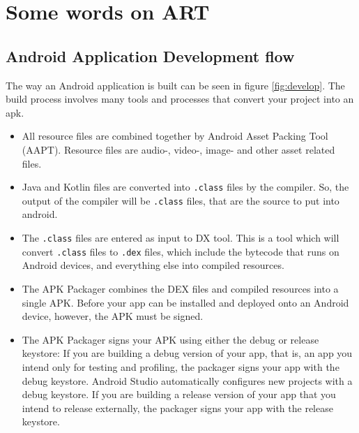 \section{Some words on ART}
\subsection{Android Application Development flow}
The way an Android application is built can be seen in figure \ref{fig:develop}.
The build process involves many tools and processes that convert your project into an \gls{apk}.

\begin{itemize}
	\item All resource files are combined together by Android Asset Packing Tool (AAPT).
		Resource files are audio-, video-, image-  and other asset related files.
	\item Java and Kotlin files are converted into \texttt{.class} files by the compiler.
		So, the output of the compiler will be \texttt{.class} files, that are the source to put into android.
	\item The \texttt{.class}  files are entered as input to DX tool.
		This is a tool which will convert \texttt{.class} files to \texttt{.dex} files, which include the bytecode that runs on Android devices, and everything else into compiled resources.
	\item The APK Packager combines the DEX files and compiled resources into a single APK.
		Before your app can be installed and deployed onto an Android device, however, the APK must be signed.
	\item The APK Packager signs your APK using either the debug or release keystore:
		If you are building a debug version of your app, that is, an app you intend only for testing and profiling, the packager signs your app with the debug keystore.
		Android Studio automatically configures new projects with a debug keystore.
		If you are building a release version of your app that you intend to release externally, the packager signs your app with the release keystore.
\end{itemize}



